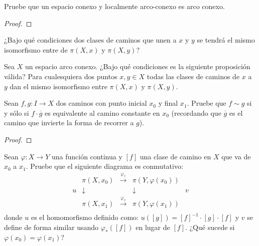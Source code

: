 \documentclass[12pt]{report}
\theoremstyle{largebreak}
\newcommand\cf[3]{\ensuremath{#1:#2\rightarrow#3}}
\begin{document}
    \begin{excer}
        Pruebe que un espacio conexo y localmente arco-conexo es arco conexo.
    \end{excer}

    \begin{proof}
        
    \end{proof}

    \begin{excer}
        ¿Bajo qué condiciones dos clases de caminos que unen a $x$ y $y$ se tendrá el mismo isomorfismo entre de $\pi(X,x)$ y $\pi(X,y)$?
    \end{excer}

    \begin{sol}
        
    \end{sol}

    \begin{excer}
        Sea $X$ un espacio arco conexo. ¿Bajo qué condiciones es la siguiente proposición válida? Para cualesquiera dos puntos $x,y\in X$ todas las clases de caminos de $x$ a $y$ dan el mismo isomorfismo entre $\pi(X,x)$ y $\pi(X,y)$. 
    \end{excer}

    \begin{sol}
        
    \end{sol}

    \begin{excer}
        Sean $\cf{f,g}{I}{X}$ dos caminos con punto inicial $x_0$ y final $x_1$. Pruebe que $f\sim g$ si y sólo si $f\cdot\overline{g}$ es equivalente al camino constante en $x_0$ (recordando que $\overline{g}$ es el camino que invierte la forma de recorrer a $g$).
    \end{excer}

    \begin{proof}
        
    \end{proof}

    \begin{excer}
        Sean $\cf{\varphi}{X}{Y}$ una función continua y $[f]$ una clase de camino en $X$ que va de $x_0$ a $x_1$. Pruebe que el siguiente diagrama es conmutativo:
        \begin{equation*}
            \begin{array}{rcccl}
              & \pi(X,x_0) & \overset{\varphi_*}{\longrightarrow} & \pi(Y,\varphi(x_0)) & \\
              u & \downarrow & & \downarrow & v \\
               & \pi(X,x_1) & \overset{\varphi_*}{\longrightarrow} & \pi(Y,\varphi(x_1)) & \\
            \end{array}
        \end{equation*}
        donde $u$ es el homomorfismo definido como: $u([g])=[f]^{-1}\cdot[g]\cdot[f]$ y $v$ se define de forma similar usando $\varphi_*([f])$ en lugar de $[f]$. ¿Qué sucede si $\varphi(x_0)=\varphi(x_1)$?
    \end{excer}
\end{document}
